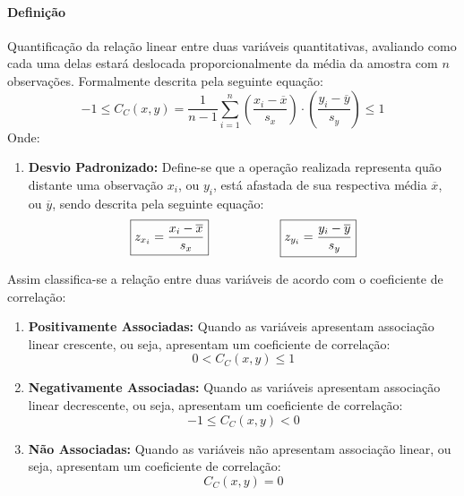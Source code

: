 \documentclass{article}
\begin{document}
            \paragraph{Definição}Quantificação da relação linear entre duas variáveis quantitativas, avaliando como cada uma delas estará deslocada proporcionalmente da média da amostra com $n$ observações. Formalmente descrita pela seguinte equação:
                \begin{equation}
                    \boxed{
                        -1 \le
                        C_{C}(x,y) = \frac{1}{n-1} \sum_{i=1}^{n} 
                        \left(\frac{x_{i}-\overline{x}}{s_{x}}\right)
                        \cdot
                        \left(\frac{y_{i}-\overline{y}}{s_{y}}\right)
                        \le 1
                    }
                \end{equation}
            Onde:
                \begin{enumerate}[rightmargin = \leftmargin, noitemsep]
                    \item \textbf{Desvio Padronizado:} Define-se que a operação realizada representa quão distante uma observação $x_{i}$, ou $y_{i}$, está afastada de sua respectiva média $\overline{x}$, ou $\overline{y}$, sendo descrita pela seguinte equação:
                        \begin{equation}
                            \boxed{
                                z_{x_{i}} = \frac{x_{i}-\overline{x}}{s_{x}}
                            }
                            \hspace{20mm}
                            \boxed{
                                z_{y_{i}} = \frac{y_{i}-\overline{y}}{s_{y}}
                            }
                        \end{equation}
                \end{enumerate}
            Assim classifica-se a relação entre duas variáveis de acordo com o coeficiente de correlação:
                \begin{enumerate}[rightmargin = \leftmargin, noitemsep]
                    \item \textbf{Positivamente Associadas:} Quando as variáveis apresentam associação linear crescente, ou seja, apresentam um coeficiente de correlação:
                        \[\boxed{0 < C_{C}(x,y) \le 1}\]
                    \item \textbf{Negativamente Associadas:} Quando as variáveis apresentam associação linear decrescente, ou seja, apresentam um coeficiente de correlação:
                        \[\boxed{-1 \le C_{C}(x,y) < 0}\]
                    \item \textbf{Não Associadas:} Quando as variáveis não apresentam associação linear, ou seja, apresentam um coeficiente de correlação:
                        \[\boxed{C_{C}(x,y) = 0}\]
                \end{enumerate}
\end{document}
